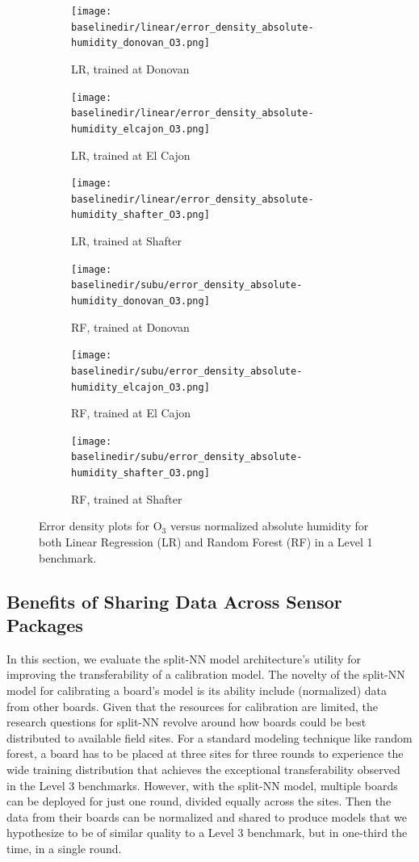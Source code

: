 \documentclass[journal abbreviation, manuscript]{copernicus}
\newcommand{\textus}[1]{$_{\text{#1}}$}
\begin{document}
\begin{figure}[t]
\centering
\begin{subfigure}{0.33\textwidth}
\texttt{[image: \\baselinedir/linear/error\_density\_absolute-humidity\_donovan\_O3.png]}
\caption{LR, trained at Donovan}
\end{subfigure}
\begin{subfigure}{0.33\textwidth}
\texttt{[image: \\baselinedir/linear/error\_density\_absolute-humidity\_elcajon\_O3.png]}
\caption{LR, trained at El Cajon}
\end{subfigure}
\begin{subfigure}{0.33\textwidth}
\texttt{[image: \\baselinedir/linear/error\_density\_absolute-humidity\_shafter\_O3.png]}
\caption{LR, trained at Shafter}
\end{subfigure}
\begin{subfigure}{0.33\textwidth}
\texttt{[image: \\baselinedir/subu/error\_density\_absolute-humidity\_donovan\_O3.png]}
\caption{RF, trained at Donovan}
\end{subfigure}
\begin{subfigure}{0.33\textwidth}
\texttt{[image: \\baselinedir/subu/error\_density\_absolute-humidity\_elcajon\_O3.png]}
\caption{RF, trained at El Cajon}
\end{subfigure}
\begin{subfigure}{0.33\textwidth}
\texttt{[image: \\baselinedir/subu/error\_density\_absolute-humidity\_shafter\_O3.png]}
\caption{RF, trained at Shafter}
\end{subfigure}
\caption{Error density plots for O\textus{3} versus normalized absolute humidity for both Linear Regression (LR) and Random Forest (RF) in a Level 1 benchmark.}
\label{fig:error-density}
\end{figure}


\subsection{Benefits of Sharing Data Across Sensor Packages}
In this section, we evaluate the split-NN model architecture's utility for improving the transferability of a calibration model.  The novelty of the split-NN model for calibrating a board's model is its ability include (normalized) data from other boards.  Given that the resources for calibration are limited, the research questions for split-NN revolve around how boards could be best distributed to available field sites.  For a standard modeling technique like random forest, a board has to be placed at three sites for three rounds to experience the wide training distribution that achieves the exceptional transferability observed in the Level 3 benchmarks.  However, with the split-NN model, multiple boards can be deployed for just one round, divided equally across the sites.  Then the data from their boards can be normalized and shared to produce models that we hypothesize to be of similar quality to a Level 3 benchmark, but in one-third the time, in a single round.
\end{document}
